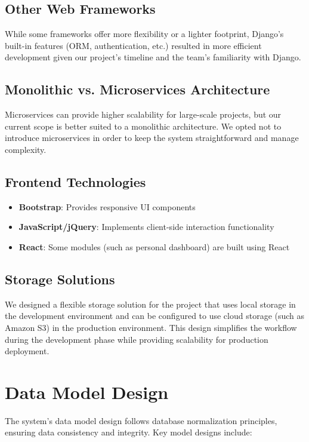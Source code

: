 \subsection{Other Web Frameworks}
While some frameworks offer more flexibility or a lighter footprint, Django's built-in features 
(ORM, authentication, etc.) resulted in more efficient development given our project's timeline 
and the team's familiarity with Django.

\subsection{Monolithic vs. Microservices Architecture}
Microservices can provide higher scalability for large-scale projects, but our current scope 
is better suited to a monolithic architecture. We opted not to introduce microservices in order 
to keep the system straightforward and manage complexity.


\subsection{Frontend Technologies}
\begin{itemize}
    \item \textbf{Bootstrap}: Provides responsive UI components
    \item \textbf{JavaScript/jQuery}: Implements client-side interaction functionality
    \item \textbf{React}: Some modules (such as personal dashboard) are built using React
\end{itemize}

\subsection{Storage Solutions}
We designed a flexible storage solution for the project that uses local storage in the development environment and can be configured to use cloud storage (such as Amazon S3) in the production environment. This design simplifies the workflow during the development phase while providing scalability for production deployment.

\section{Data Model Design}

The system's data model design follows database normalization principles, ensuring data consistency and integrity. Key model designs include:

